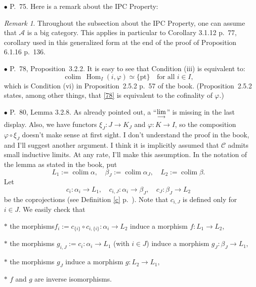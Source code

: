 \documentclass[12pt]{article}
\theoremstyle{remark}%
\newtheorem{rk}[thm]{Remark}
\newcommand{\bu}{\bullet}
\newcommand{\n}{\noindent}
\newcommand{\A}{\mathcal A}
\newcommand{\C}{\mathcal C}
\newcommand{\p}{\varphi}
\newcommand{\pt}{\{\text{pt}\}}
\newcommand{\pr}{Proposition}
\newcommand{\colim}{\operatornamewithlimits{\underset{\longrightarrow}{lim}}}
\DeclareMathOperator*{\coli}{colim}
\DeclareMathOperator*{\co}{colim}
\DeclareMathOperator{\h}{Hom}
\begin{document}

\n$\bu$ P.~75. Here is a remark about the IPC Property: 
% 
\begin{rk}\label{ipc} 
Throughout the subsection about the IPC Property, one can assume that $\A$ is a big category. This applies in particular to Corollary 3.1.12 p.~77, corollary used in this generalized form at the end of the proof of Proposition 6.1.16 p.~136. 
\end{rk} 


\n$\bu$ P.~78, \pr\ 3.2.2. It is easy to see that Condition (iii) is equivalent to: 
%
\begin{equation}\label{78} 
\co\ \h_I(i,\p)\simeq\pt\quad\text{for all }i\in I, 
\end{equation} 
% 
which is Condition (vi) in \pr\ 2.5.2 p.~57 of the book. (\pr\ 2.5.2 states, among other things, that \eqref{78} is equivalent to the cofinality of $\p$.) 


\n$\bu$ P.~80, Lemma 3.2.8. As already pointed out, a ``$\displaystyle\colim$'' is missing in the last display. Also, we have functors $\xi_J:J\to K_J$ and $\varphi:K\to I$, so the composition $\varphi\circ\xi_J$ doesn't make sense at first sight. I don't understand the proof in the book, and I'll suggest another argument. I think it is implicitly assumed that $\C$ admits small inductive limits. At any rate, I'll make this assumption. In the notation of the lemma as stated in the book, put 
$$
L_1:=\coli\alpha,\quad
\beta_J:=\coli\alpha_J,\quad
L_2:=\coli\beta.
$$
Let 
$$
c_i:\alpha_i\to L_1,\quad 
c_{i,J}:\alpha_i\to\beta_J,\quad 
c_J:\beta_J\to L_2
$$
be the coprojections (see Definition \ref{c} p.~\pageref{c}). Note that $c_{i,J}$ is defined only for $i\in J$. We easily check that 

\n$*$ the morphisms$f_i:=c_{\{i\}}\circ c_{i,\{i\}}:\alpha_i\to L_2$ induce a morphism $f:L_1\to L_2$, 

\n$*$ the morphisms $g_{i,J}:=c_i:\alpha_i\to L_1$ (with $i\in J$) induce a morphism $g_J:\beta_J\to L_1$, 

\n$*$ the morphisms $g_J$ induce a morphism $g:L_2\to L_1$, 

\n$*$ $f$ and $g$ are inverse isomorphisms. 

\end{document}
